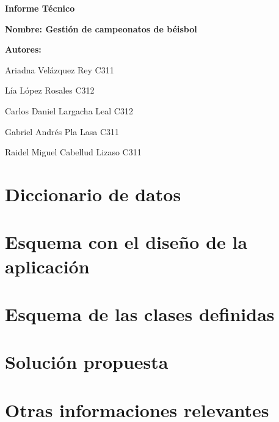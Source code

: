 \documentclass{report}
\begin{document}
    \begin{titlepage}
        \centering
        {\bfseries\Huge Informe Técnico \par}
        \vspace*{1cm}
        \vspace*{3cm}
        \vspace*{1cm}
        {\LARGE \textbf{Nombre: Gestión de campeonatos de béisbol} }
        \vfill
        {\bfseries\LARGE Autores: \par}
        {\Large Ariadna Vel\'azquez Rey  C311 \par} 
        {\Large L\'ia L\'opez Rosales  C312 \par} 
        {\Large Carlos Daniel Largacha Leal  C312 \par} 
        {\Large Gabriel Andr\'es Pla Lasa  C311 \par} 
        {\Large Raidel Miguel Cabellud Lizaso C311 \par} 
        \vfill
    \end{titlepage}

    \section*{Diccionario de datos}

    \section*{Esquema con el diseño de la aplicación}

    \section*{Esquema de las clases definidas}

    \section*{Solución propuesta}

    \section*{Otras informaciones relevantes}
\end{document}
